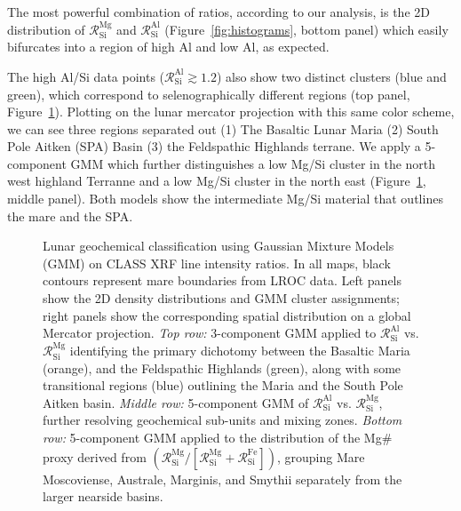\documentclass[twocolumn,linenumbers]{aastex631}
\newcommand{\revone}[1]{#1}
\newcommand{\revtwo}[1]{#1}
\begin{document}
The most powerful combination of ratios, according to our analysis, is the 2D \revone{distribution} of $\mathcal{R}^\text{Mg}_\text{Si}$ and $\mathcal{R}^\text{Al}_\text{Si}$ \revone{(Figure~\ref{fig:histograms}, bottom panel)} which easily bifurcates into a region of high Al and low Al, as expected. 


The high Al/Si data points \revone{($\mathcal{R}^\text{Al}_\text{Si} \gtrsim 1.2$)} also show two distinct clusters \revone{(blue and green)}, which correspond to selenographically different regions (\revone{top panel, }Figure~\ref{fig:maps3}). Plotting on the lunar mercator projection with this same color scheme, we can see three regions separated out (1) The Basaltic Lunar Maria (2) South Pole Aitken (SPA) Basin (3) the Feldspathic Highlands terrane.  We apply a \revone{5}-component GMM which further distinguishes a low Mg/Si cluster in the north west highland Terranne and a low Mg/Si cluster in the north east \revone{(Figure~\ref{fig:maps3}, middle panel)}. Both models show the intermediate Mg/Si material that outlines the mare and the SPA. 


\begin{figure}[htbp]
    \vspace{-25pt}
    \vspace{-25pt}
    \caption{\revone{Lunar geochemical classification using Gaussian Mixture Models (GMM) on CLASS XRF line intensity ratios. In all maps, black contours represent mare boundaries from LROC data. Left panels show the 2D density distributions and GMM cluster assignments; right panels show the corresponding spatial distribution on a global Mercator projection.
    \textit{Top row:} 3-component GMM applied to $\mathcal{R}^\text{Al}_\text{Si}$ vs. $\mathcal{R}^\text{Mg}_\text{Si}$ identifying the primary dichotomy between the Basaltic Maria (orange), and the Feldspathic Highlands (green), along with some transitional regions (blue) outlining the Maria and the South Pole Aitken basin.
    \textit{Middle row:} 5-component GMM of $\mathcal{R}^\text{Al}_\text{Si}$ vs. $\mathcal{R}^\text{Mg}_\text{Si}$, further resolving geochemical sub-units and mixing zones. 
    \textit{Bottom row:} 5-component GMM applied to the distribution of the Mg\# proxy derived from $(\mathcal{R}^\text{Mg}_\text{Si} / [\mathcal{R}^\text{Mg}_\text{Si} + \mathcal{R}^\text{Fe}_\text{Si}])$,} \revtwo{grouping Mare Moscoviense, Australe, Marginis, and Smythii separately from the larger nearside basins.}}
    \label{fig:maps3}
\end{figure}
\end{document}
